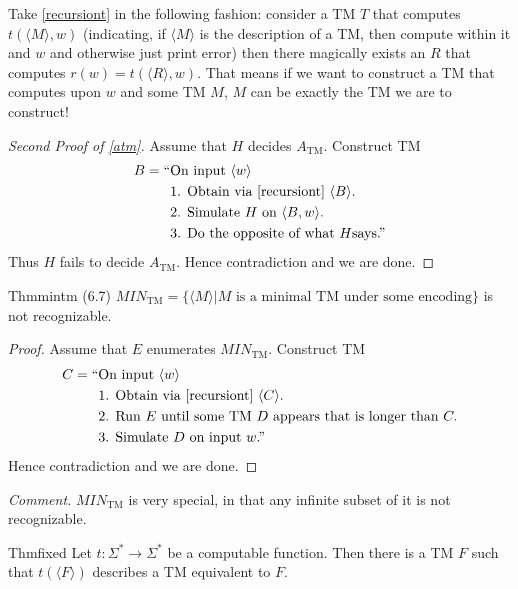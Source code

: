 Take \ref{recursiont} in the following fashion: consider a TM $T$ that computes $t(\langle M\rangle,w)$ (indicating, if $\langle M\rangle$ is the description of a TM, then compute within it and $w$ and otherwise just print error) then there magically exists an $R$ that computes $r(w)=t(\langle R\rangle,w)$. That means if we want to construct a TM that computes upon $w$ and some TM $M$, $M$ can be exactly the TM we are to construct!

\begin{proof}[Second Proof of \ref{atm}]
  Assume that $H$ decides $A_{\mathrm{TM}}$. Construct TM
  \begin{align*}
    B=\text{``} & \text{On input }\langle w\rangle                        \\
                & \text{1. Obtain via \ref{recursiont} }\langle B\rangle. \\
                & \text{2. Simulate }H\text{ on }\langle B,w\rangle.      \\
                & \text{3. Do the opposite of what }H\text{says.''}
  \end{align*}
  Thus $H$ fails to decide $A_{\mathrm{TM}}$. Hence contradiction and we are done.
\end{proof}

\begin{reference}{Thm}{mintm}
  (6.7) $MIN_{\mathrm{TM}}=\{\langle M\rangle|M\text{ is a minimal TM under some encoding}\}$ is not recognizable.
\end{reference}

\begin{proof}
  Assume that $E$ enumerates $MIN_{\mathrm{TM}}$. Construct TM
  \begin{align*}
    C=\text{``} & \text{On input }\langle w\rangle                                             \\
                & \text{1. Obtain via \ref{recursiont} }\langle C\rangle.                      \\
                & \text{2. Run }E\text{ until some TM }D\text{ appears that is longer than }C. \\
                & \text{3. Simulate }D\text{ on input }w\text{.''}
  \end{align*}
  Hence contradiction and we are done.
\end{proof}

\textit{Comment.} $MIN_{\mathrm{TM}}$ is very special, in that any infinite subset of it is not recognizable.

\begin{reference}{Thm}{fixed}
  Let $t:\Sigma^*\to \Sigma^*$ be a computable function. Then there is a TM $F$ such that $t(\langle F\rangle)$ describes a TM equivalent to $F$.
\end{reference}

